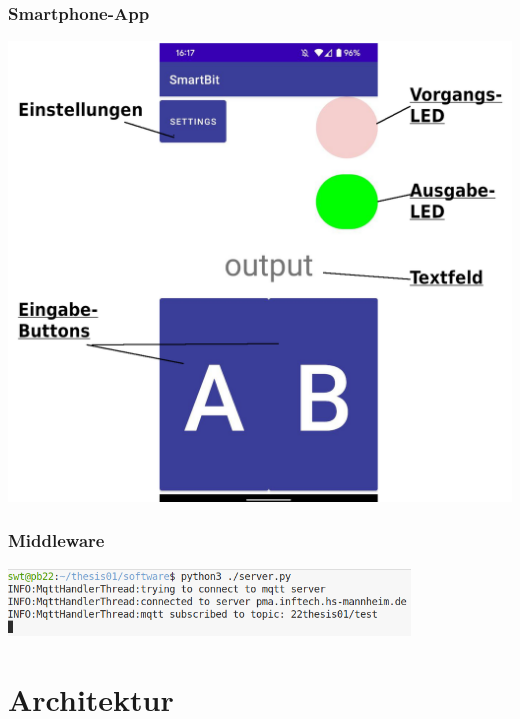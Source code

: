 \documentclass{beamer}
\begin{document}
\begin{frame}
    \frametitle{Smartphone-App}
    \centering
    \includegraphics[height=0.9\textheight]{images/app_initial.png}
\end{frame}

\begin{frame}[fragile]
    \frametitle{Middleware}
    \begin{center}
    \includegraphics[width=0.8\textwidth]{images/middleware.png}
    \end{center}
\end{frame}

\section{Architektur}
\end{document}
